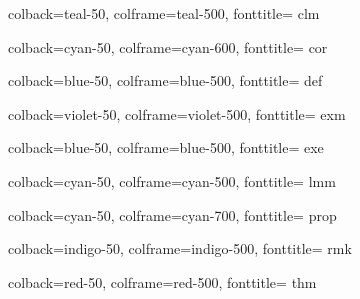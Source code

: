 
{
    colback=teal-50,
    colframe=teal-500,
    fonttitle=\bfseries
}{clm}

{
    colback=cyan-50,
    colframe=cyan-600,
    fonttitle=\bfseries
}{cor}

{
    colback=blue-50,
    colframe=blue-500,
    fonttitle=\bfseries
}{def}

{
    colback=violet-50,
    colframe=violet-500,
    fonttitle=\bfseries
}{exm}

{
    colback=blue-50,
    colframe=blue-500,
    fonttitle=\bfseries
}{exe}

{
    colback=cyan-50,
    colframe=cyan-500,
    fonttitle=\bfseries
}{lmm}

{
    colback=cyan-50,
    colframe=cyan-700,
    fonttitle=\bfseries
}{prop}

{
    colback=indigo-50,
    colframe=indigo-500,
    fonttitle=\bfseries
}{rmk}

{
    colback=red-50,
    colframe=red-500,
    fonttitle=\bfseries
}{thm}
